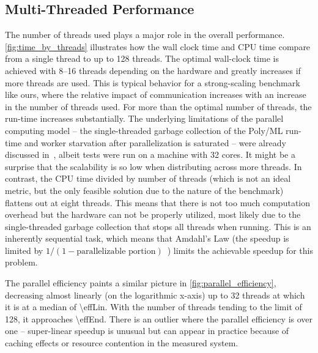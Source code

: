 \subsection{Multi-Threaded Performance}\label{sec:performance_threads}
The number of threads used plays a major role in the overall performance.
\autoref{fig:time_by_threads} illustrates how the wall clock time and CPU time compare from a single thread to up to \num{128} threads.
The optimal wall-clock time is achieved with \numrange{8}{16} threads
depending on the hardware and greatly increases if more threads are used.
This is typical behavior for a strong-scaling benchmark like ours,
where the relative impact of communication increases with an increase in the number of threads used.
For more than the optimal number of threads,
the run-time increases substantially.
The underlying limitations of the parallel computing model 
-- the single-threaded garbage collection of the Poly/ML run-time and worker starvation after parallelization is saturated --
were already discussed in~\cite{PolyParallel2010Matthews},
albeit tests were run on a machine with 32 cores.
It might be a surprise that the scalability is so low when distributing across more threads.
In contrast,
the CPU time divided by number of threads
(which is not an ideal metric, but the only feasible solution due to the nature of the benchmark)
flattens out at eight threads.
This means that there is not too much computation overhead
but the hardware can not be properly utilized,
most likely due to the single-threaded garbage collection that stops all threads when running.
This is an inherently sequential task, which means that Amdahl's Law (the speedup is limited by $1 / (1-\text{parallelizable portion})$~\cite{amdahls}) limits the achievable speedup for this problem.


The parallel efficiency paints a similar picture in \autoref{fig:parallel_efficiency},
decreasing  almost linearly (on the logarithmic x-axis) up to \num{32} threads
at which it is at a median of \num[round-mode=places,round-precision=3]{\effLin}.
With the number of threads tending to the limit of \num{128},
it approaches \num[round-mode=places,round-precision=3]{\effEnd}.
There is an outlier where the parallel efficiency is over one --
super-linear speedup is unusual but can appear in practice because of caching effects or resource contention in the measured system.



